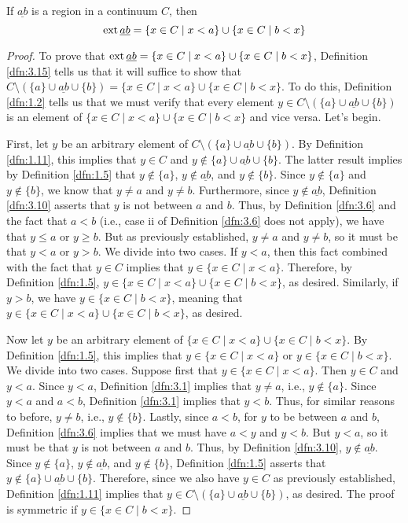 \documentclass[../main.tex]{subfiles}
\begin{document}
\begin{lemma}\label{lem:3.16}
    If $\underline{ab}$ is a region in a continuum $C$, then
    \begin{equation*}
        \operatorname{ext}\underline{ab} = \{x\in C\mid x<a\}\cup\{x\in C\mid b<x\}
    \end{equation*}
    \begin{proof}
        To prove that $\operatorname{ext}\underline{ab}=\{x\in C\mid x<a\}\cup\{x\in C\mid b<x\}$, Definition \ref{dfn:3.15} tells us that it will suffice to show that $C\setminus(\{a\}\cup\underline{ab}\cup\{b\})=\{x\in C\mid x<a\}\cup\{x\in C\mid b<x\}$. To do this, Definition \ref{dfn:1.2} tells us that we must verify that every element $y\in C\setminus(\{a\}\cup\underline{ab}\cup\{b\})$ is an element of $\{x\in C\mid x<a\}\cup\{x\in C\mid b<x\}$ and vice versa. Let's begin.\par
        First, let $y$ be an arbitrary element of $C\setminus(\{a\}\cup\underline{ab}\cup\{b\})$. By Definition \ref{dfn:1.11}, this implies that $y\in C$ and $y\notin\{a\}\cup\underline{ab}\cup\{b\}$. The latter result implies by Definition \ref{dfn:1.5} that $y\notin\{a\}$, $y\notin\underline{ab}$, and $y\notin\{b\}$. Since $y\notin\{a\}$ and $y\notin\{b\}$, we know that $y\neq a$ and $y\neq b$. Furthermore, since $y\notin\underline{ab}$, Definition \ref{dfn:3.10} asserts that $y$ is not between $a$ and $b$. Thus, by Definition \ref{dfn:3.6} and the fact that $a<b$ (i.e., case ii of Definition \ref{dfn:3.6} does not apply), we have that $y\leq a$ or $y\geq b$. But as previously established, $y\neq a$ and $y\neq b$, so it must be that $y<a$ or $y>b$. We divide into two cases. If $y<a$, then this fact combined with the fact that $y\in C$ implies that $y\in\{x\in C\mid x<a\}$. Therefore, by Definition \ref{dfn:1.5}, $y\in\{x\in C\mid x<a\}\cup\{x\in C\mid b<x\}$, as desired. Similarly, if $y>b$, we have $y\in\{x\in C\mid b<x\}$, meaning that $y\in\{x\in C\mid x<a\}\cup\{x\in C\mid b<x\}$, as desired.\par
        Now let $y$ be an arbitrary element of $\{x\in C\mid x<a\}\cup\{x\in C\mid b<x\}$. By Definition \ref{dfn:1.5}, this implies that $y\in\{x\in C\mid x<a\}$ or $y\in\{x\in C\mid b<x\}$. We divide into two cases. Suppose first that $y\in\{x\in C\mid x<a\}$. Then $y\in C$ and $y<a$. Since $y<a$, Definition \ref{dfn:3.1} implies that $y\neq a$, i.e., $y\notin\{a\}$. Since $y<a$ and $a<b$, Definition \ref{dfn:3.1} implies that $y<b$. Thus, for similar reasons to before, $y\neq b$, i.e., $y\notin\{b\}$. Lastly, since $a<b$, for $y$ to be between $a$ and $b$, Definition \ref{dfn:3.6} implies that we must have $a<y$ and $y<b$. But $y<a$, so it must be that $y$ is not between $a$ and $b$. Thus, by Definition \ref{dfn:3.10}, $y\notin\underline{ab}$. Since $y\notin\{a\}$, $y\notin\underline{ab}$, and $y\notin\{b\}$, Definition \ref{dfn:1.5} asserts that $y\notin\{a\}\cup\underline{ab}\cup\{b\}$. Therefore, since we also have $y\in C$ as previously established, Definition \ref{dfn:1.11} implies that $y\in C\setminus(\{a\}\cup\underline{ab}\cup\{b\})$, as desired. The proof is symmetric if $y\in\{x\in C\mid b<x\}$.
    \end{proof}
\end{lemma}
\end{document}
